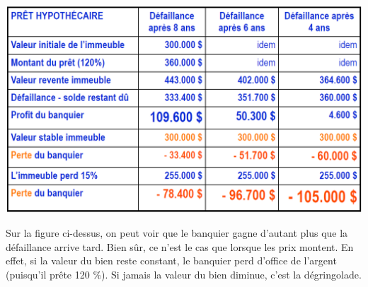 \begin{center}
\includegraphics[scale=0.4]{1}
\end{center}

Sur la figure ci-dessus, on peut voir que le banquier gagne d'autant plus que la défaillance arrive tard. Bien sûr, ce n'est le cas que lorsque les prix montent. En effet, si la valeur du bien reste constant, le banquier perd d'office de l'argent (puisqu'il prête 120 \%). Si jamais la valeur du bien diminue, c'est la dégringolade.
